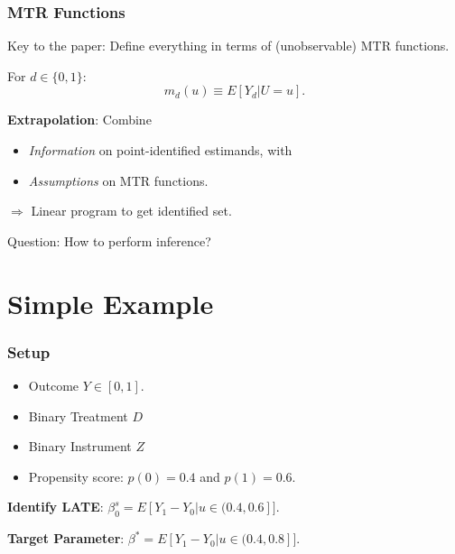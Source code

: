 \documentclass[11pt, aspectratio=169]{beamer}
\begin{document}
\begin{frame}
    \frametitle{MTR Functions}

    Key to the paper: Define everything in terms of (unobservable) MTR functions.

    For $d\in\{0,1\}$:
    \begin{equation}
        m_d(u) \equiv E[Y_d | U=u].
    \end{equation}

    \vspace{0.5cm}

    \textbf{Extrapolation}: Combine
    \begin{itemize}
        \item \textit{Information} on point-identified estimands, with
        \item \textit{Assumptions} on MTR functions.
    \end{itemize}

    \vspace{0.5cm}

    $\Rightarrow$ Linear program to get identified set.

    \vspace{0.5cm}

    Question: How to perform inference?
\end{frame}

\section{Simple Example}

\begin{frame}
    \frametitle{Setup}

    \begin{itemize}
        \item Outcome $Y \in [0,1]$.
        \item Binary Treatment $D$
        \item Binary Instrument $Z$
        \item Propensity score: $p(0) = 0.4$ and $p(1) = 0.6$.
    \end{itemize}

    \vspace{0.5cm}

    \textbf{Identify LATE}: $\beta_0^s = E[Y_1 - Y_0 | u \in (0.4, 0.6]]$.

    \vspace{0.5cm}

    \textbf{Target Parameter}: $\beta^* = E[Y_1 - Y_0 | u \in (0.4, 0.8]]$.

\end{frame}
\end{document}

